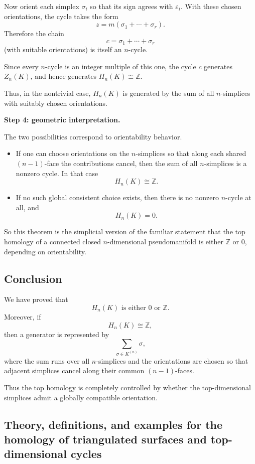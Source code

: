 \documentclass[12pt,a4paper]{article}
\theoremstyle{notespace}
\begin{document}
Now orient each simplex \(\sigma_i\) so that its sign agrees with \(\varepsilon_i\). With these chosen orientations, the cycle takes the form
\[
z=m(\sigma_1+\cdots+\sigma_r).
\]
Therefore the chain
\[
c=\sigma_1+\cdots+\sigma_r
\]
(with suitable orientations) is itself an \(n\)-cycle.

Since every \(n\)-cycle is an integer multiple of this one, the cycle \(c\) generates \(Z_n(K)\), and hence generates \(H_n(K)\cong \mathbb Z\).

Thus, in the nontrivial case, \(H_n(K)\) is generated by the sum of all \(n\)-simplices with suitably chosen orientations.

\medskip

\textbf{Step 4: geometric interpretation.}

The two possibilities correspond to orientability behavior.

\begin{itemize}
	\item If one can choose orientations on the \(n\)-simplices so that along each shared \((n-1)\)-face the contributions cancel, then the sum of all \(n\)-simplices is a nonzero cycle. In that case
	\[
	H_n(K)\cong \mathbb Z.
	\]
	
	\item If no such global consistent choice exists, then there is no nonzero \(n\)-cycle at all, and
	\[
	H_n(K)=0.
	\]
\end{itemize}

So this theorem is the simplicial version of the familiar statement that the top homology of a connected closed \(n\)-dimensional pseudomanifold is either \(\mathbb Z\) or \(0\), depending on orientability.

\subsection{Conclusion}

We have proved that
\[
\boxed{H_n(K)\text{ is either }0\text{ or }\mathbb Z.}
\]
Moreover, if
\[
H_n(K)\cong \mathbb Z,
\]
then a generator is represented by
\[
\sum_{\sigma\in K^{(n)}} \sigma,
\]
where the sum runs over all \(n\)-simplices and the orientations are chosen so that adjacent simplices cancel along their common \((n-1)\)-faces.

Thus the top homology is completely controlled by whether the top-dimensional simplices admit a globally compatible orientation.

\subsection{Theory, definitions, and examples for the homology of triangulated surfaces and top-dimensional cycles}
\end{document}
